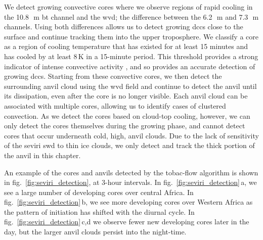 We detect growing convective cores where we observe regions of rapid cooling in the 10.8\,\unit{\mu m} \acrshort{bt} channel and the \acrshort{wvd}; the difference between the 6.2\,\unit{\mu m} and 7.3\,\unit{\mu m} channels. 
Using both differences allows us to detect growing \acrshort{dcc}s close to the surface and continue tracking them into the upper troposphere. 
We classify a core as a region of cooling temperature that has existed for at least 15 minutes and has cooled by at least 8\,\unit{K} in a 15-minute period. 
This threshold provides a strong indicator of intense convective activity \citep{roberts_nowcasting_2003}, and so provides an accurate detection of growing \acrshort{dcc}s. 
Starting from these convective cores, we then detect the surrounding anvil cloud using the \acrshort{wvd} field \citep{muller_role_2018, muller_novel_2019} and continue to detect the anvil until its dissipation, even after the core is no longer visible. 
Each anvil cloud can be associated with multiple cores, allowing us to identify cases of clustered convection. 
As we detect the cores based on cloud-top cooling, however, we can only detect the cores themselves during the growing phase, and cannot detect cores that occur underneath cold, high, anvil clouds. 
Due to the lack of sensitivity of the \acrshort{seviri} \acrshort{swd} to thin ice clouds, we only detect and track the thick portion of the anvil in this chapter.

An example of the cores and anvils detected by the tobac-flow algorithm is shown in fig.~\ref{fig:seviri_detection}, at 3-hour intervals. In fig.~\ref{fig:seviri_detection}\,a, we see a large number of developing cores over central Africa. 
In fig.~\ref{fig:seviri_detection}\,b, we see more developing cores over Western Africa as the pattern of initiation has shifted with the diurnal cycle.
In fig.~\ref{fig:seviri_detection}\,c,d we observe fewer new developing cores later in the day, but the larger anvil clouds persist into the night-time.


